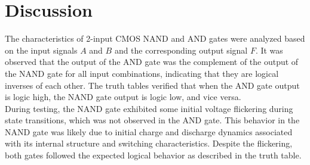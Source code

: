 \documentclass[a4paper,12pt]{article}
\begin{document}
\section{Discussion}
The characteristics of 2-input CMOS NAND and AND gates were analyzed based on the input signals \(A\) and \(B\) and the corresponding output signal \(F\). It was observed that the output of the AND gate was the complement of the output of the NAND gate for all input combinations, indicating that they are logical inverses of each other. The truth tables verified that when the AND gate output is logic high, the NAND gate output is logic low, and vice versa.\\

During testing, the NAND gate exhibited some initial voltage flickering during state transitions, which was not observed in the AND gate. This behavior in the NAND gate was likely due to initial charge and discharge dynamics associated with its internal structure and switching characteristics. Despite the flickering, both gates followed the expected logical behavior as described in the truth table.

	
\end{document}
